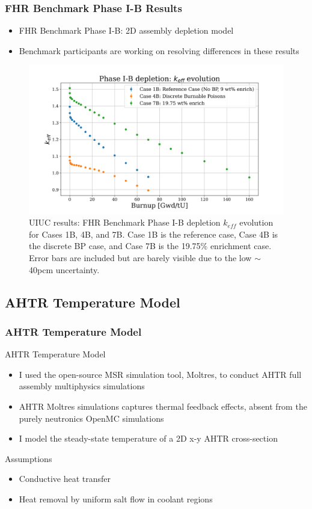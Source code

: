 \begin{frame}
    \frametitle{FHR Benchmark Phase I-B Results}
    \begin{itemize}
        \item FHR Benchmark Phase I-B: 2D assembly depletion model
        \item Benchmark participants are working on resolving differences in 
        these results
    \end{itemize}
    \vspace{-0.2cm}
    \begin{figure}[]
        \centering
        \includegraphics[width=0.75\linewidth]{../docs/figures/phase1b_keff.png} 
        \caption{UIUC results: FHR Benchmark Phase I-B depletion 
        $k_{eff}$ evolution for Cases 1B, 4B, and 7B. Case 1B is the reference case, 
        Case 4B is the discrete \acrlong{BP} case, and Case 7B is the 19.75$\%$ 
        enrichment case. Error bars are included but are barely visible due to the 
        low $\sim$40pcm uncertainty.}
    \end{figure}
\end{frame}

\subsection{AHTR Temperature Model}
\begin{frame}
    \frametitle{AHTR Temperature Model}
    \begin{block}{AHTR Temperature Model}
        \begin{itemize}
            \item I used the open-source MSR simulation tool, Moltres, to conduct AHTR
            full assembly multiphysics simulations 
            \item AHTR Moltres simulations captures thermal feedback effects, absent
            from the purely neutronics OpenMC simulations
            \item I model the steady-state temperature of a 2D x-y AHTR cross-section
        \end{itemize}
    \end{block}
    \begin{block}{Assumptions}
        \begin{itemize}
            \item Conductive heat transfer 
            \item Heat removal by uniform salt flow in coolant regions
        \end{itemize}
    \end{block}

\end{frame}